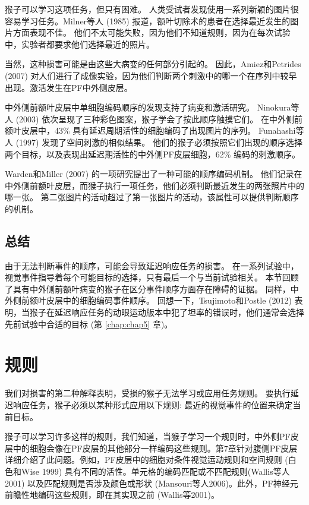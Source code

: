 猴子可以学习这项任务，但只有困难。
人类受试者发现使用一系列新颖的图片很容易学习任务。Milner等人 (1985) 报道，额叶切除术的患者在选择最近发生的图片方面表现不佳。
他们不太可能失败，因为他们不知道规则，因为在每次试验中，实验者都要求他们选择最近的照片。


当然，这种损害可能是由这些大病变的任何部分引起的。
因此，Amiez和Petrides (2007) 对人们进行了成像实验，因为他们判断两个刺激中的哪一个在序列中较早出现。激活发生在PF中外侧皮层。


中外侧前额叶皮层中单细胞编码顺序的发现支持了病变和激活研究。
Ninokura等人 (2003) 依次呈现了三种彩色图案，猴子学会了按此顺序触摸它们。
在中外侧前额叶皮层中，43\% 具有延迟周期活性的细胞编码了出现图片的序列。
Funahashi等人 (1997) 发现了空间刺激的相似结果。
他们的猴子必须按照它们出现的顺序选择两个目标，以及表现出延迟期活性的中外侧PF皮层细胞，62\% 编码的刺激顺序。


Warden和Miller (2007) 的一项研究提出了一种可能的顺序编码机制。
他们记录在中外侧前额叶皮层，而猴子执行一项任务，他们必须判断最近发生的两张照片中的哪一张。
第二张图片的活动超过了第一张图片的活动，该属性可以提供判断顺序的机制。



\subsection{总结}

由于无法判断事件的顺序，可能会导致延迟响应任务的损害。
在一系列试验中，视觉事件指导着每个可能目标的选择，只有最后一个与当前试验相关。
本节回顾了具有中外侧前额叶病变的猴子在区分事件顺序方面存在障碍的证据。
同样，中外侧前额叶皮层中的细胞编码事件顺序。
回想一下，Tsujimoto和Postle (2012) 表明，当猴子在延迟响应任务的动眼运动版本中犯了坦率的错误时，他们通常会选择先前试验中合适的目标 (第 \ref{chap:chap5} 章)。



\section{规则}

我们对损害的第二种解释表明，受损的猴子无法学习或应用任务规则。
要执行延迟响应任务，猴子必须以某种形式应用以下规则: 最近的视觉事件的位置来确定当前目标。


猴子可以学习许多这样的规则，我们知道，当猴子学习一个规则时，中外侧PF皮层中的细胞会像在PF皮层的其他部分一样编码这些规则。第7章针对腹侧PF皮层详细介绍了此问题。例如，PF皮层中的细胞对条件视觉运动规则和空间规则 (白色和Wise 1999) 具有不同的活性。单元格的编码匹配或不匹配规则(Wallis等人2001) 以及匹配规则是否涉及颜色或形状 (Mansouri等人2006)。此外，PF神经元前瞻性地编码这些规则，即在其实现之前 (Wallis等2001)。

